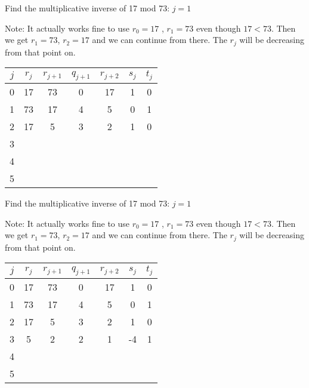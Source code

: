 \documentclass{beamer}
\begin{document}
\begin{frame}{Find the multiplicative inverse of 17 mod 73: $j=1$}

Note: It actually works fine to use $r_0=17$ , $r_1=73$ even though $17<73$.
Then we get $r_1=73$, $r_2=17$ and we can continue from there.
The $r_j$ will be decreasing from that point on.

\vspace{1em}

\begin{tabular}{|c|c|c|c|c|c|c|}\hline
$j$   &  $r_{j}$    & $r_{j+1}$ & $q_{j+1}$ & $r_{j+2}$ & $s_j$ & $t_j$ \\ \hline\hline
0     &  17         &  73       &    0      &   17      &  1    &   0   \\ \hline
1     &  73         &  17       &    4      &    5      &  0    &   1   \\ \hline
2     &  17         &   5       &    3      &    2      &  1     &  0     \\ \hline
3     &             &           &           &           &       &       \\ \hline
4     &             &           &           &           &       &       \\ \hline
5     &             &           &           &           &       &       \\ \hline
\end{tabular}

\end{frame}

\begin{frame}{Find the multiplicative inverse of 17 mod 73: $j=1$}

Note: It actually works fine to use $r_0=17$ , $r_1=73$ even though $17<73$.
Then we get $r_1=73$, $r_2=17$ and we can continue from there.
The $r_j$ will be decreasing from that point on.

\vspace{1em}

\begin{tabular}{|c|c|c|c|c|c|c|}\hline
$j$   &  $r_{j}$    & $r_{j+1}$ & $q_{j+1}$ & $r_{j+2}$ & $s_j$ & $t_j$ \\ \hline\hline
0     &  17         &  73       &    0      &   17      &  1    &   0   \\ \hline
1     &  73         &  17       &    4      &    5      &  0    &   1   \\ \hline
2     &  17         &   5       &    3      &    2      &  1    &   0   \\ \hline
3     &   5         &   2       &    2      &    1      & -4    &   1   \\ \hline
4     &             &           &           &           &       &       \\ \hline
5     &             &           &           &           &       &       \\ \hline
\end{tabular}

\end{frame}
\end{document}

